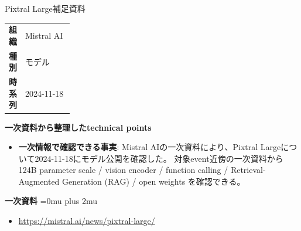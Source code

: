 \begin{technicalnote}{Pixtral Large}{補足資料}
\begingroup
\begin{tabularx}{\linewidth}{@{}>{\bfseries}p{0.22\linewidth}X@{}}
組織 & Mistral AI \\
種別 & モデル \\
時系列 & 2024-11-18 \\
\end{tabularx}
\smallskip
{\bfseries 一次資料から整理したtechnical points}
\begin{itemize}[leftmargin=1.5em,itemsep=0.35em]
\item \textbf{一次情報で確認できる事実}: Mistral AIの一次資料により、Pixtral Largeについて2024-11-18にモデル公開を確認した。 対象event近傍の一次資料から 124B parameter scale / vision encoder / function calling / Retrieval-Augmented Generation (RAG) / open weights を確認できる。
\end{itemize}
\begin{minipage}{\linewidth}
\begin{samepage}
{\bfseries 一次資料}
\begingroup\sloppy
\Urlmuskip=0mu plus 2mu\relax
\begin{itemize}[leftmargin=1.5em,itemsep=0.25em]
\item {\scriptsize\url{https://mistral.ai/news/pixtral-large/}}
\end{itemize}
\endgroup
\end{samepage}
\end{minipage}
\endgroup
\end{technicalnote}
\medskip
